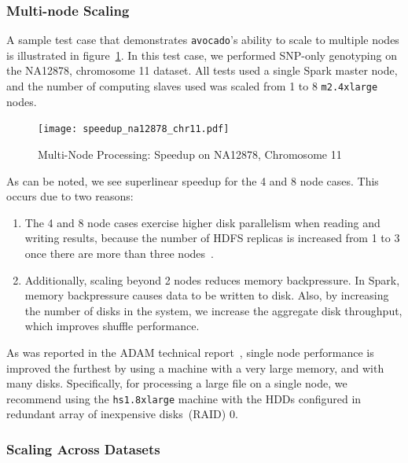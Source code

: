 \documentclass{acm_proc_article-sp}
\begin{document}
\subsubsection{Multi-node Scaling}
\label{sec:multi-node-scaling}

A sample test case that demonstrates \texttt{avocado}'s ability to scale to multiple nodes is illustrated in figure~\ref{fig:speedup}. In this
test case, we performed SNP-only genotyping on the NA12878, chromosome 11 dataset. All tests used a single Spark master node, and
the number of computing slaves used was scaled from 1 to 8 \texttt{m2.4xlarge} nodes.

\begin{figure}[h]
\begin{center}
\texttt{[image: speedup\_na12878\_chr11.pdf]}
\end{center}
\caption{Multi-Node Processing: Speedup on NA12878, Chromosome 11}
\label{fig:speedup}
\end{figure}

As can be noted, we see superlinear speedup for the 4 and 8 node cases. This occurs due to two reasons:

\begin{enumerate}
\item The 4 and 8 node cases exercise higher disk parallelism when reading and writing results, because the number of HDFS replicas
is increased from 1 to 3 once there are more than three nodes~\cite{borthakur07}.
\item Additionally, scaling beyond 2 nodes reduces memory backpressure. In Spark, memory backpressure causes data to be written to
disk. Also, by increasing the number of disks in the system, we increase the aggregate disk throughput, which improves shuffle performance.
\end{enumerate}

As was reported in the ADAM technical report~\cite{massie13}, single node performance is improved the furthest by using a machine
with a very large memory, and with many disks. Specifically, for processing a large file on a single node, we recommend using the
\texttt{hs1.8xlarge} machine with the HDDs configured in redundant array of inexpensive disks~(RAID) 0.

\subsubsection{Scaling Across Datasets}
\label{sec:scaling-across-datasets}
\end{document}
